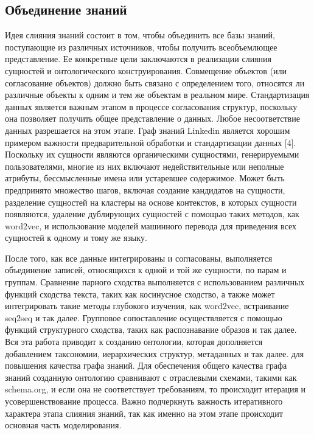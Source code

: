 \subsection{Объединение знаний}

Идея слияния знаний состоит в том, чтобы объединить все базы знаний, поступающие из различных источников, чтобы получить всеобъемлющее
представление. Ее конкретные цели заключаются в реализации слияния сущностей и онтологического конструирования. Совмещение объектов (или
согласование объектов) должно быть связано с определением того, относятся ли различные объекты к одним и тем же объектам в реальном мире.
Стандартизация данных является важным этапом в процессе согласования структур, поскольку она позволяет получить общее представление о данных.
Любое несоответствие данных разрешается на этом этапе. Граф знаний Linkedin является хорошим примером важности предварительной обработки и
стандартизации данных [4]. Поскольку их сущности являются органическими сущностями, генерируемыми пользователями, многие из них включают
недействительные или неполные атрибуты, бессмысленные имена или устаревшее содержимое. Может быть предпринято множество шагов, включая
создание кандидатов на сущности, разделение сущностей на кластеры на основе контекстов, в которых сущности появляются, удаление дублирующих
сущностей с помощью таких методов, как word2vec, и использование моделей машинного перевода для приведения всех сущностей к одному и тому же языку.

После того, как все данные интегрированы и согласованы, выполняется объединение записей, относящихся к одной и той же сущности, по парам и
группам. Сравнение парного сходства выполняется с использованием различных функций сходства текста, таких как косинусное сходство, а также
может интегрировать такие методы глубокого изучения, как word2vec, встраивание seq2seq и так далее. Групповое сопоставление осуществляется
с помощью функций структурного сходства, таких как распознавание образов и так далее. Вся эта работа приводит к созданию онтологии, которая
дополняется добавлением таксономии, иерархических структур, метаданных и так далее. для повышения качества графа знаний. Для обеспечения
общего качества графа знаний созданную онтологию сравнивают с отраслевыми схемами, такими как schema.org, и если она не соответствует
требованиям, то происходит итерация и усовершенствование процесса. Важно подчеркнуть важность итеративного характера этапа слияния знаний,
так как именно на этом этапе происходит основная часть моделирования.

